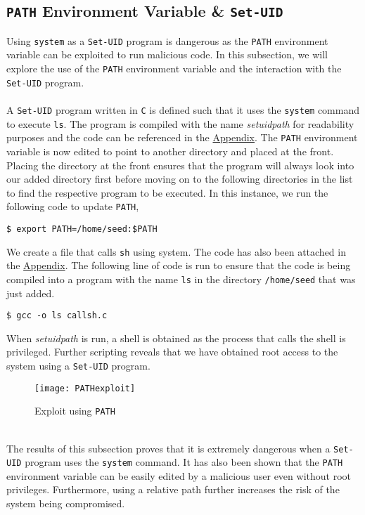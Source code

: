 \documentclass[a4paper,12pt]{article}
\begin{document}
\subsection{\texttt{PATH} Environment Variable \& \texttt{Set-UID}}
Using \texttt{system} as a \texttt{Set-UID} program is dangerous as the \texttt{PATH} environment variable can be exploited to run malicious code. In this subsection, we will explore the use of the \texttt{PATH} environment variable and the interaction with the \texttt{Set-UID} program.\\\\A \texttt{Set-UID} program written in \texttt{C} is defined such that it uses the \texttt{system} command to execute \texttt{ls}. The program is  compiled with the name \textit{setuidpath} for readability purposes and the code can be referenced in the \hyperref[Appsec:3.6]{Appendix}. The \texttt{PATH} environment variable is now edited to point to another directory and placed at the front. Placing the directory at the front ensures that the program will always look into our added directory first before moving on to the following directories in the list to find the respective program to be executed. In this instance, we run the following code to update \texttt{PATH},
\begin{verbatim}$ export PATH=/home/seed:$PATH\end{verbatim}
We create a file that calls \texttt{sh} using system. The code has also been attached in the \hyperref[Appsec:3.6.2]{Appendix}. The following line of code is run to ensure that the code is being compiled into a program with the name \texttt{ls} in the directory \texttt{/home/seed} that was just added.
\begin{verbatim}
$ gcc -o ls callsh.c
\end{verbatim}
When \textit{setuidpath} is run, a shell is obtained as the process that calls the shell is privileged. Further scripting reveals that we have obtained root access to the system using a \texttt{Set-UID} program.
\begin{figure}[h]
	\centering
	\texttt{[image: PATHexploit]}
	\caption{Exploit using \texttt{PATH}}
	\label{fig:pathexploit}
\end{figure}
\\The results of this subsection proves that it is extremely dangerous when a \texttt{Set-UID} program uses the \texttt{system} command. It has also been shown that the \texttt{PATH} environment variable can be easily edited by a malicious user even without root privileges. Furthermore, using a relative path further increases the risk of the system being compromised.
\end{document}
